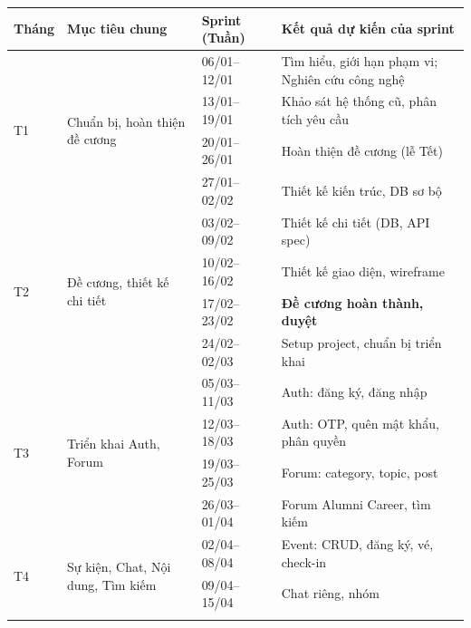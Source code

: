 \documentclass[12pt,a4paper]{article}
\begin{document}
\begin{longtable}{|p{1.5cm}|p{5cm}|p{3cm}|p{6cm}|}
\hline
\textbf{Tháng} & \textbf{Mục tiêu chung} & \textbf{Sprint (Tuần)} & \textbf{Kết quả dự kiến của sprint} \\
\hline
\endhead

\multirow{4}{*}{T1} &
\multirow{4}{=}{Chuẩn bị, hoàn thiện đề cương} &
06/01--12/01 &
Tìm hiểu, giới hạn phạm vi; Nghiên cứu công nghệ \\
\cline{3-4}

& & 13/01--19/01 &
Khảo sát hệ thống cũ, phân tích yêu cầu \\
\cline{3-4}

& & 20/01--26/01 &
Hoàn thiện đề cương (lễ Tết) \\
\cline{3-4}

& & 27/01--02/02 &
Thiết kế kiến trúc, DB sơ bộ \\
\hline

\multirow{4}{*}{T2} &
\multirow{4}{=}{Đề cương, thiết kế chi tiết} &
03/02--09/02 &
Thiết kế chi tiết (DB, API spec) \\
\cline{3-4}

& & 10/02--16/02 &
Thiết kế giao diện, wireframe \\
\cline{3-4}

& & 17/02--23/02 &
\textbf{Đề cương hoàn thành, duyệt} \\
\cline{3-4}

& & 24/02--02/03 &
Setup project, chuẩn bị triển khai \\
\hline

\multirow{4}{*}{T3} &
\multirow{4}{=}{Triển khai Auth, Forum} &
05/03--11/03 &
Auth: đăng ký, đăng nhập \\
\cline{3-4}

& & 12/03--18/03 &
Auth: OTP, quên mật khẩu, phân quyền \\
\cline{3-4}

& & 19/03--25/03 &
Forum: category, topic, post \\
\cline{3-4}

& & 26/03--01/04 &
Forum Alumni Career, tìm kiếm \\
\hline

\multirow{4}{*}{T4} &
\multirow{4}{=}{Sự kiện, Chat, Nội dung, Tìm kiếm} &
02/04--08/04 &
Event: CRUD, đăng ký, vé, check-in \\
\cline{3-4}

& & 09/04--15/04 &
Chat riêng, nhóm \\
\cline{3-4}


\end{longtable}
\end{document}
